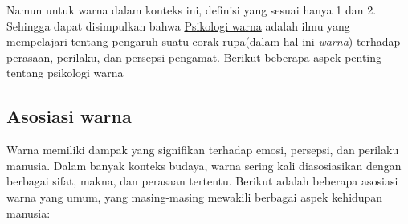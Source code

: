 \documentclass[a4paper]{article}
\begin{document}
Namun untuk warna dalam konteks ini, definisi yang sesuai hanya 1 dan 2. Sehingga dapat disimpulkan bahwa \underline{Psikologi warna} adalah ilmu yang mempelajari tentang pengaruh suatu corak rupa(dalam hal ini \textit{warna}) terhadap perasaan, perilaku, dan persepsi pengamat.
Berikut beberapa aspek penting tentang psikologi warna

\subsection{Asosiasi warna}
Warna memiliki dampak yang signifikan terhadap emosi, persepsi, dan perilaku manusia. Dalam banyak konteks budaya, warna sering kali diasosiasikan dengan berbagai sifat, makna, dan perasaan tertentu. Berikut adalah beberapa asosiasi warna yang umum, yang masing-masing mewakili berbagai aspek kehidupan manusia:
\end{document}
